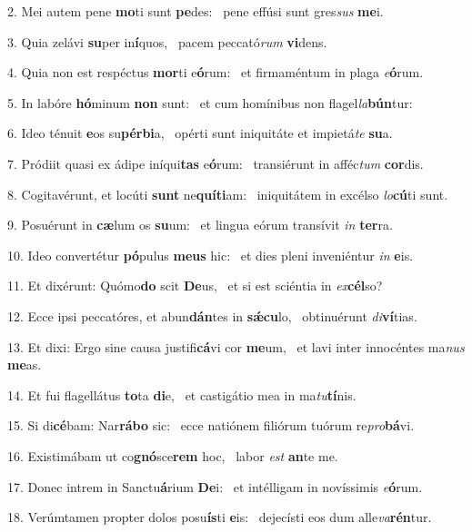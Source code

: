 2. Mei autem pene \textbf{mo}ti sunt \textbf{pe}des: \ast\  pene effúsi sunt gres\textit{sus} \textbf{me}i.\

3. Quia zelávi \textbf{su}per in\textbf{í}quos, \ast\  pacem peccató\textit{rum} \textbf{vi}dens.\

4. Quia non est respéctus \textbf{mor}ti e\textbf{ó}rum: \ast\  et firmaméntum in plaga \textit{e}\textbf{ó}rum.\

5. In labóre \textbf{hó}minum \textbf{non} sunt: \ast\  et cum homínibus non flagel\textit{la}\textbf{bún}tur:\

6. Ideo ténuit \textbf{e}os su\textbf{pér}\textbf{bi}a, \ast\  opérti sunt iniquitáte et impietá\textit{te} \textbf{su}a.\

7. Pródiit quasi ex ádipe iníqui\textbf{tas} e\textbf{ó}rum: \ast\  transiérunt in afféc\textit{tum} \textbf{cor}dis.\

8. Cogitavérunt, et locúti \textbf{sunt} ne\textbf{quí}\textbf{ti}am: \ast\  iniquitátem in excélso \textit{lo}\textbf{cú}ti sunt.\

9. Posuérunt in \textbf{cæ}lum os \textbf{su}um: \ast\  et lingua eórum transívit \textit{in} \textbf{ter}ra.\

10. Ideo convertétur \textbf{pó}pulus \textbf{me}\textbf{us} hic: \ast\  et dies pleni inveniéntur \textit{in} \textbf{e}is.\

11. Et dixérunt: Quómo\textbf{do} scit \textbf{De}us, \ast\  et si est sciéntia in \textit{ex}\textbf{cél}so?\

12. Ecce ipsi peccatóres, et abun\textbf{dán}tes in \textbf{sǽ}\textbf{cu}lo, \ast\  obtinuérunt \textit{di}\textbf{ví}tias.\

13. Et dixi: Ergo sine causa justifi\textbf{cá}vi cor \textbf{me}um, \ast\  et lavi inter innocéntes ma\textit{nus} \textbf{me}as.\

14. Et fui flagellátus \textbf{to}ta \textbf{di}e, \ast\  et castigátio mea in ma\textit{tu}\textbf{tí}nis.\

15. Si di\textbf{cé}bam: Nar\textbf{rá}\textbf{bo} sic: \ast\  ecce natiónem filiórum tuórum re\textit{pro}\textbf{bá}vi.\

16. Existimábam ut co\textbf{gnó}sce\textbf{rem} hoc, \ast\  labor \textit{est} \textbf{an}te me.\

17. Donec intrem in Sanctu\textbf{á}rium \textbf{De}i: \ast\  et intélligam in novíssimis \textit{e}\textbf{ó}rum.\

18. Verúmtamen propter dolos posu\textbf{ís}ti \textbf{e}is: \ast\  dejecísti eos dum alle\textit{va}\textbf{rén}tur.\

